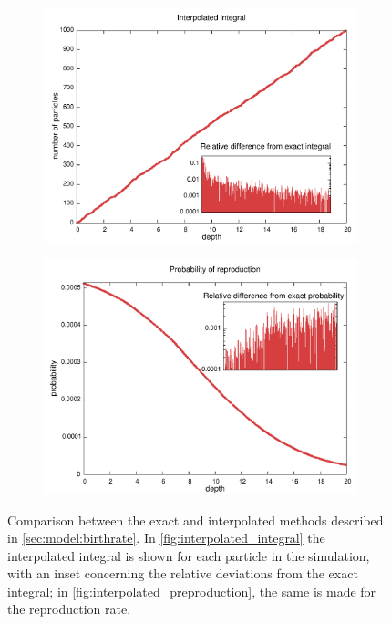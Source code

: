 \begin{figure}
 \begin{subfigure}[b]{0.45\textwidth}
    \includegraphics[width=\textwidth]{data/1D_model/test_integral/interpolated_integral}
    \caption{}
    \label{fig:interpolated_integral}
  \end{subfigure}
  \begin{subfigure}[b]{0.45\textwidth}
    \includegraphics[width=\textwidth]{data/1D_model/test_integral/interpolated_preproduction}
    \caption{}
    \label{fig:interpolated_preproduction}
  \end{subfigure}
  \caption{Comparison between the exact and interpolated methods described in \autoref{sec:model:birthrate}. In \autoref{fig:interpolated_integral} the interpolated integral is shown for each particle in the simulation, with an inset concerning the relative deviations from the exact integral; in \autoref{fig:interpolated_preproduction}, the same is made for the reproduction rate.}
  \label{fig:compare_integral}
\end{figure}



